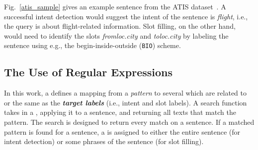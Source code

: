 
 Fig.~\ref{atis_sample} gives an example sentence from the ATIS dataset~\cite{hemphill1990atis}. A successful intent
detection would suggest the intent of the sentence is \emph{flight}, i.e., the query is about flight-related information. Slot filling,
on the other hand, would need to identify the slots \emph{fromloc.city} and \emph{toloc.city} by labeling the sentence using e.g.,
the begin-inside-outside (\texttt{BIO}) scheme.




%


\subsection{The Use of Regular Expressions}
\label{re_desc}

In this work, a \RE defines a mapping from a \emph{pattern} to several \textbf{\emph{\REtags}} which are related to or the same as the
\textbf{\emph{target labels}} (i.e., intent and slot labels). A search function takes in a \RE, applying it to a sentence, and returning
all texts that match the pattern. The search is designed to return every match on a sentence. If a matched pattern is found for a sentence,
a \REtag is assigned to either the entire sentence (for intent detection) or some phrases of the sentence (for slot filling).

